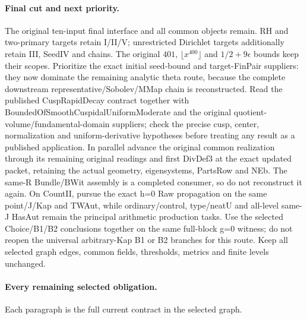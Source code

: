 \paragraph{Final cut and next priority.}
The original ten-input final interface and all common objects
remain. RH and two-primary targets retain I/II/V;
unrestricted Dirichlet targets additionally retain III,
SeedIV and chains. The original $401$, $\lfloor x^{400}\rfloor$
and $1/2+9\epsilon$ bounds keep their scopes.
Prioritize the exact initial seed-bound and target-FinPair suppliers: they now dominate the remaining analytic theta route, because the complete downstream representative/Sobolev/MMap chain is reconstructed. Read the published CuspRapidDecay contract together with BoundedOfSmoothCuspidalUniformModerate and the original quotient-volume/fundamental-domain suppliers; check the precise cusp, center, normalization and uniform-derivative hypotheses before treating any result as a published application. In parallel advance the original common realization through its remaining original readings and first DivDef3 at the exact updated packet, retaining the actual geometry, eigensystems, PartsRow and NEb. The same-R Bundle/BWit assembly is a completed consumer, so do not reconstruct it again. On CountII, pursue the exact h=0 Raw propagation on the same point/J/Kap and TWAut, while ordinary/control, type/neatU and all-level same-J HasAut remain the principal arithmetic production tasks. Use the selected Choice/B1/B2 conclusions together on the same full-block g=0 witness; do not reopen the universal arbitrary-Kap B1 or B2 branches for this route. Keep all selected graph edges, common fields, thresholds, metrics and finite levels unchanged.

\paragraph{Every remaining selected obligation.}
Each paragraph is the full current contract in the selected graph.
